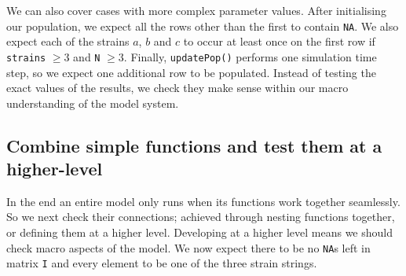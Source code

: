 \documentclass[10pt,letterpaper]{article}
\newenvironment{Shaded}{\begin{snugshade}}{\end{snugshade}}
\newcommand{\CommentTok}[1]{\textcolor[rgb]{0.56,0.35,0.01}{\textit{#1}}}
\newcommand{\DataTypeTok}[1]{\textcolor[rgb]{0.13,0.29,0.53}{#1}}
\newcommand{\DecValTok}[1]{\textcolor[rgb]{0.00,0.00,0.81}{#1}}
\newcommand{\KeywordTok}[1]{\textcolor[rgb]{0.13,0.29,0.53}{\textbf{#1}}}
\newcommand{\NormalTok}[1]{#1}
\newcommand{\OperatorTok}[1]{\textcolor[rgb]{0.81,0.36,0.00}{\textbf{#1}}}
\newcommand{\StringTok}[1]{\textcolor[rgb]{0.31,0.60,0.02}{#1}}
\begin{document}
We can also cover cases with more complex parameter values.
After initialising our population, we expect all the rows other than the first to contain \texttt{NA}.
We also expect each of the strains \(a\), \(b\) and \(c\) to occur at least once on the first row if \texttt{strains} \(\geq 3\) and \texttt{N} \(\geq 3\).
Finally, \texttt{updatePop()} performs one simulation time step, so we expect one additional row to be populated.
Instead of testing the exact values of the results, we check they make sense within our macro understanding of the model system.
\newline
{}\label{test_complex}

\begin{Shaded}
\end{Shaded}

\hypertarget{combine}{%
\subsection*{Combine simple functions and test them at a higher-level}\label{combine}}

In the end an entire model only runs when its functions work together seamlessly.
So we next check their connections; achieved through nesting functions together, or defining them at a higher level.
Developing at a higher level means we should check macro aspects of the model.
We now expect there to be no \texttt{NA}s left in matrix \texttt{I} and every element to be one of the three strain strings.
\newline
{}\label{combine_simple_func}
\end{document}
